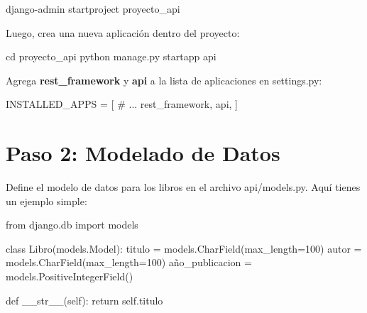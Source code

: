 \documentclass[
  a4paper,
  DIV=11,
  numbers=noendperiod,
  onepage,
  openany]{scrreprt}
\newenvironment{Shaded}{\begin{snugshade}}{\end{snugshade}}
\newcommand{\BuiltInTok}[1]{\textcolor[rgb]{0.00,0.23,0.31}{#1}}
\newcommand{\CommentTok}[1]{\textcolor[rgb]{0.37,0.37,0.37}{#1}}
\newcommand{\ControlFlowTok}[1]{\textcolor[rgb]{0.00,0.23,0.31}{#1}}
\newcommand{\DecValTok}[1]{\textcolor[rgb]{0.68,0.00,0.00}{#1}}
\newcommand{\ExtensionTok}[1]{\textcolor[rgb]{0.00,0.23,0.31}{#1}}
\newcommand{\FunctionTok}[1]{\textcolor[rgb]{0.28,0.35,0.67}{#1}}
\newcommand{\ImportTok}[1]{\textcolor[rgb]{0.00,0.46,0.62}{#1}}
\newcommand{\KeywordTok}[1]{\textcolor[rgb]{0.00,0.23,0.31}{#1}}
\newcommand{\NormalTok}[1]{\textcolor[rgb]{0.00,0.23,0.31}{#1}}
\newcommand{\OperatorTok}[1]{\textcolor[rgb]{0.37,0.37,0.37}{#1}}
\newcommand{\StringTok}[1]{\textcolor[rgb]{0.13,0.47,0.30}{#1}}
\newcommand{\VariableTok}[1]{\textcolor[rgb]{0.07,0.07,0.07}{#1}}
\begin{document}
\begin{Shaded}
\begin{Highlighting}[]
\ExtensionTok{django{-}admin}\NormalTok{ startproject proyecto\_api}
\end{Highlighting}
\end{Shaded}

Luego, crea una nueva aplicación dentro del proyecto:

\begin{Shaded}
\begin{Highlighting}[]
\BuiltInTok{cd}\NormalTok{ proyecto\_api}
\ExtensionTok{python}\NormalTok{ manage.py startapp api}
\end{Highlighting}
\end{Shaded}

Agrega \textbf{rest\_framework} y \textbf{api} a la lista de
aplicaciones en settings.py:

\begin{Shaded}
\begin{Highlighting}[]
\NormalTok{INSTALLED\_APPS }\OperatorTok{=}\NormalTok{ [}
        \CommentTok{\# ...}
        \StringTok{\textquotesingle{}rest\_framework\textquotesingle{}}\NormalTok{,}
        \StringTok{\textquotesingle{}api\textquotesingle{}}\NormalTok{,}
\NormalTok{    ]}
\end{Highlighting}
\end{Shaded}

\section{Paso 2: Modelado de Datos}\label{paso-2-modelado-de-datos}

Define el modelo de datos para los libros en el archivo api/models.py.
Aquí tienes un ejemplo simple:

\begin{Shaded}
\begin{Highlighting}[]
\ImportTok{from}\NormalTok{ django.db }\ImportTok{import}\NormalTok{ models}

\KeywordTok{class}\NormalTok{ Libro(models.Model):}
\NormalTok{    titulo }\OperatorTok{=}\NormalTok{ models.CharField(max\_length}\OperatorTok{=}\DecValTok{100}\NormalTok{)}
\NormalTok{    autor }\OperatorTok{=}\NormalTok{ models.CharField(max\_length}\OperatorTok{=}\DecValTok{100}\NormalTok{)}
\NormalTok{    año\_publicacion }\OperatorTok{=}\NormalTok{ models.PositiveIntegerField()}

    \KeywordTok{def} \FunctionTok{\_\_str\_\_}\NormalTok{(}\VariableTok{self}\NormalTok{):}
        \ControlFlowTok{return} \VariableTok{self}\NormalTok{.titulo}
\end{Highlighting}
\end{Shaded}
\end{document}
